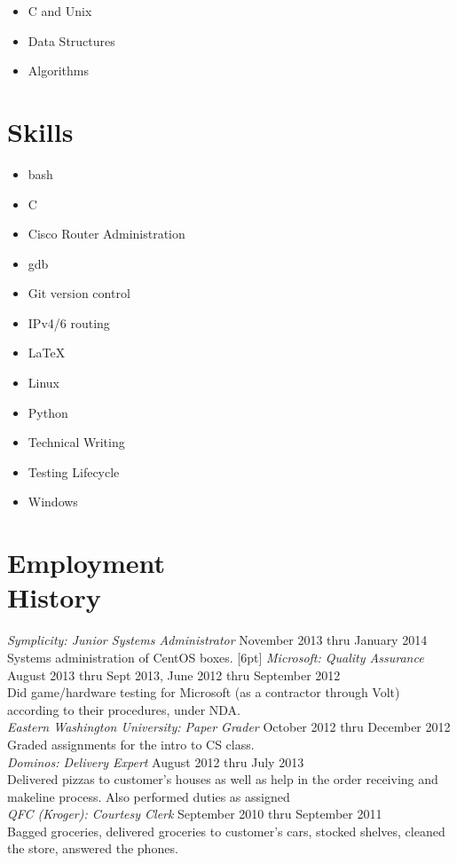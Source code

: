 \documentclass[line, margin]{res}
\begin{document}
\begin{resume}
	\begin{multicols}{3}
		\begin{itemize}
			\item C and Unix
			\item Data Structures
			\item Algorithms
		\end{itemize}
	\end{multicols}

	\section{Skills}
	\begin{multicols}{3}
		\begin{itemize}
			\item bash
			\item C
			\item Cisco Router Administration
			\item gdb
			\item Git version control
			\item IPv4/6 routing
			\item \LaTeX
			\item Linux
			\item Python
			\item Technical Writing
			\item Testing Lifecycle
			\item Windows
		\end{itemize}
	\end{multicols}

	\section{Employment\\History}
	\textit{Symplicity: Junior Systems Administrator} \hfill November 2013 thru January 2014 \\
	Systems administration of CentOS boxes. [6pt]
	\textit{Microsoft: Quality Assurance} \hfill August 2013 thru Sept 2013, June 2012 thru September 2012 \\
	Did game/hardware testing for Microsoft (as a contractor through Volt) according to their procedures, under NDA. \\ [6pt]
	\textit{Eastern Washington University: Paper Grader} \hfill October 2012 thru December 2012 \\
	Graded assignments for the intro to CS class. \\ [6pt]

	\textit{Dominos: Delivery Expert} \hfill August 2012 thru July 2013 \\
	Delivered pizzas to customer's houses as well as help in the order
	receiving and makeline process. Also performed duties as assigned \\ [6pt]
	\textit{QFC (Kroger): Courtesy Clerk} \hfill September 2010 thru September 2011 \\
	Bagged groceries, delivered groceries to customer's cars, stocked
	shelves, cleaned the store, answered the phones. \\ 

\end{resume}
\end{document}
